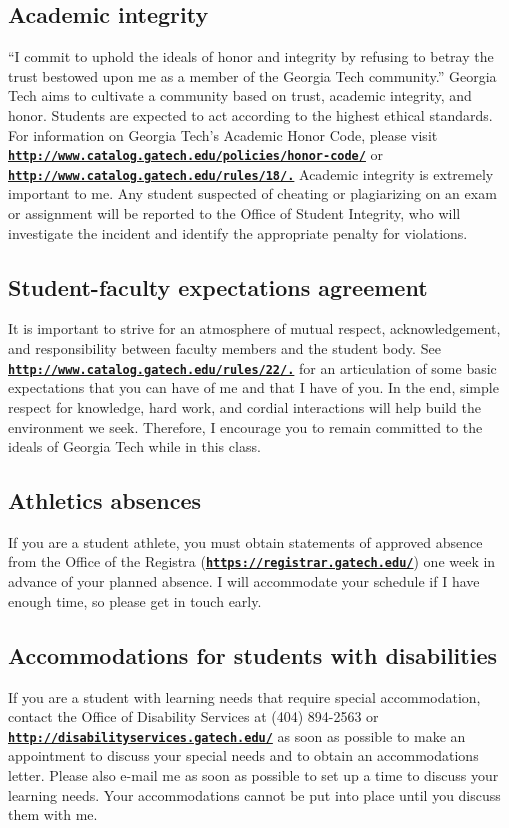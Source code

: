 \documentclass[11pt]{article}
\begin{document}
\subsection*{Academic integrity}
“I commit to uphold the ideals of honor and integrity by refusing to betray the trust bestowed
upon me as a member of the Georgia Tech community.”
Georgia   Tech   aims   to   cultivate   a   community   based   on   trust,   academic   integrity,   and   honor.
Students   are   expected   to   act   according   to   the   highest   ethical   standards.     For   information   on
Georgia   Tech's   Academic   Honor   Code,   please   visit
\href{http://www.catalog.gatech.edu/policies/honor-code/}{\tt\bf http://www.catalog.gatech.edu/policies/honor-code/}  or 
\href{http://www.catalog.gatech.edu/rules/18/.}{\tt\bf http://www.catalog.gatech.edu/rules/18/.} 
Academic integrity is extremely important to me.
Any student suspected of cheating or plagiarizing on an exam or assignment will be reported to
the Office of Student Integrity, who will investigate the incident and identify the appropriate
penalty for violations.
\subsection*{Student-faculty expectations agreement}
It   is   important   to   strive   for   an   atmosphere   of   mutual   respect,   acknowledgement,   and
responsibility   between   faculty   members   and   the   student   body.   See
\href{http://www.catalog.gatech.edu/rules/22/.}{\tt\bf http://www.catalog.gatech.edu/rules/22/.} 
 for an articulation of some basic expectations that you
can have of me and that I have of you. In the end, simple respect for knowledge, hard work, and
cordial   interactions   will   help   build   the   environment   we   seek.   Therefore,   I   encourage   you   to
remain committed to the ideals of Georgia Tech while in this class.
\subsection*{Athletics absences}
If you are a student athlete, you must obtain statements of approved absence from the Office of
the Registra (\href{https://registrar.gatech.edu/}{\tt\bf https://registrar.gatech.edu/}) one week in advance of your planned absence.  I will
accommodate your schedule if I have enough time, so please get in touch early.
\subsection*{Accommodations for students with disabilities}
If you are a student with learning needs that require special accommodation, contact the Office
of   Disability   Services   at   (404)   894-2563   or \href{http://disabilityservices.gatech.edu/}{\tt\bf http://disabilityservices.gatech.edu/}    as   soon   as
possible to make an appointment to discuss your special needs and to obtain an accommodations
letter.  Please also e-mail me as soon as possible to set up a time to discuss your learning needs.
Your accommodations cannot be put into place until you discuss them with me. 
\end{document}

